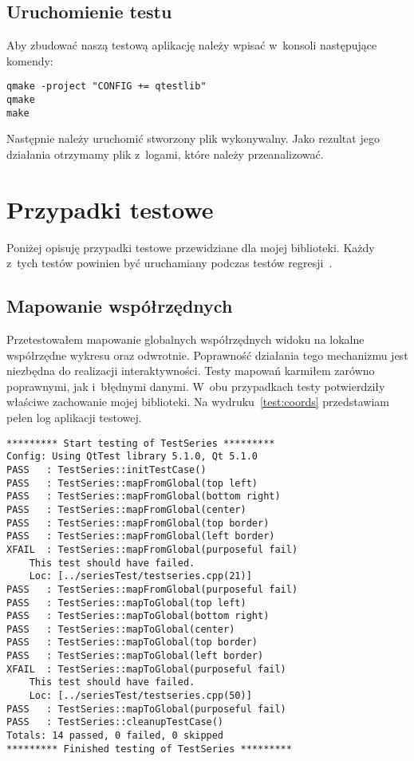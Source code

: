 \subsection{Uruchomienie testu}
Aby zbudować naszą testową aplikację należy wpisać w~konsoli następujące komendy:
\begin{lstlisting}
qmake -project "CONFIG += qtestlib"
qmake
make
\end{lstlisting}

Następnie należy uruchomić stworzony plik wykonywalny. Jako rezultat jego działania otrzymamy plik z~logami, które należy przeanalizować.

\section{Przypadki testowe}
Poniżej opisuję przypadki testowe przewidziane dla mojej biblioteki. Każdy z~tych testów powinien być uruchamiany podczas testów regresji~\cite{Sacha}.

\subsection{Mapowanie współrzędnych}
Przetestowałem mapowanie globalnych współrzędnych widoku na lokalne współrzędne wykresu oraz odwrotnie. Poprawność działania tego mechanizmu jest niezbędna do realizacji interaktywności. Testy mapowań karmiłem zarówno poprawnymi, jak i~błędnymi danymi. W~obu przypadkach testy potwierdziły właściwe zachowanie mojej biblioteki. Na wydruku~\ref{test:coords} przedstawiam pełen log aplikacji testowej.


\begin{lstlisting}[caption=Test mapowania współrzędnych, label=test:coords]
********* Start testing of TestSeries *********
Config: Using QtTest library 5.1.0, Qt 5.1.0
PASS   : TestSeries::initTestCase()
PASS   : TestSeries::mapFromGlobal(top left)
PASS   : TestSeries::mapFromGlobal(bottom right)
PASS   : TestSeries::mapFromGlobal(center)
PASS   : TestSeries::mapFromGlobal(top border)
PASS   : TestSeries::mapFromGlobal(left border)
XFAIL  : TestSeries::mapFromGlobal(purposeful fail) 
	This test should have failed.
   	Loc: [../seriesTest/testseries.cpp(21)]
PASS   : TestSeries::mapFromGlobal(purposeful fail)
PASS   : TestSeries::mapToGlobal(top left)
PASS   : TestSeries::mapToGlobal(bottom right)
PASS   : TestSeries::mapToGlobal(center)
PASS   : TestSeries::mapToGlobal(top border)
PASS   : TestSeries::mapToGlobal(left border)
XFAIL  : TestSeries::mapToGlobal(purposeful fail) 
	This test should have failed.
	Loc: [../seriesTest/testseries.cpp(50)]
PASS   : TestSeries::mapToGlobal(purposeful fail)
PASS   : TestSeries::cleanupTestCase()
Totals: 14 passed, 0 failed, 0 skipped
********* Finished testing of TestSeries *********
\end{lstlisting}

